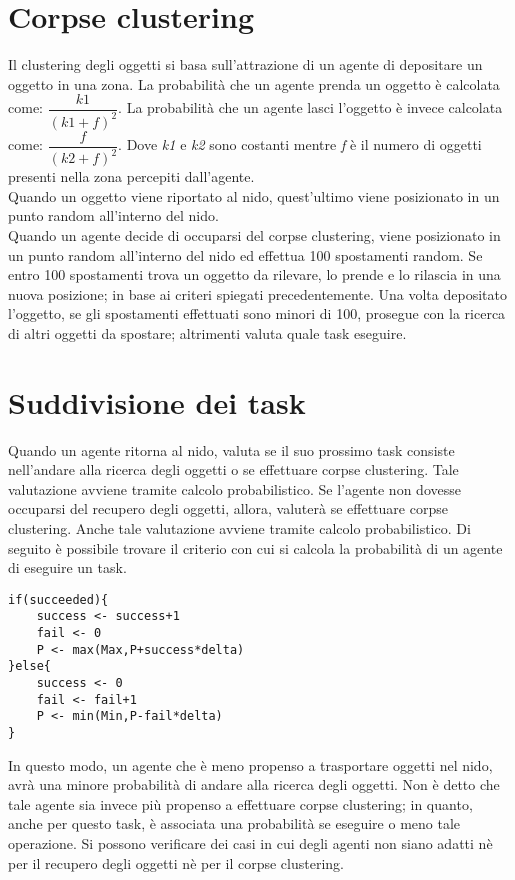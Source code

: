 \documentclass[12pt,a4paper,openright,twoside]{report}
\begin{document}
\section{Corpse clustering}

Il clustering degli oggetti si basa sull'attrazione di un agente di depositare un oggetto in una zona. La probabilità che un agente prenda un oggetto è calcolata come: $\dfrac{k1}{(k1+f)^2}$. La probabilità che un agente lasci l'oggetto è invece calcolata come: $\dfrac{f}{(k2+f)^2}$. Dove \textit{k1} e \textit{k2} sono costanti mentre \textit{f} è il numero di oggetti presenti nella zona percepiti dall'agente.\\
Quando un oggetto viene riportato al nido, quest'ultimo viene posizionato in un punto random all'interno del nido.\\
Quando un agente decide di occuparsi del corpse clustering, viene posizionato in un punto random all'interno del nido ed effettua 100 spostamenti random. Se entro 100 spostamenti trova un oggetto da rilevare, lo prende e lo rilascia in una nuova posizione; in base ai criteri spiegati precedentemente. Una volta depositato l'oggetto, se gli spostamenti effettuati sono minori di 100, prosegue con la ricerca di altri oggetti da spostare; altrimenti valuta quale task eseguire.

\section{Suddivisione dei task} 
Quando un agente ritorna al nido, valuta se il suo prossimo task consiste nell'andare alla ricerca degli oggetti o se effettuare corpse clustering. Tale valutazione avviene tramite calcolo probabilistico. Se l'agente non dovesse occuparsi del recupero degli oggetti, allora, valuterà se effettuare corpse clustering. Anche tale valutazione avviene tramite calcolo probabilistico. Di seguito è possibile trovare il criterio con cui si calcola la probabilità di un agente di eseguire un task.\\


\begin{verbatim}
if(succeeded){
    success <- success+1
    fail <- 0
    P <- max(Max,P+success*delta)
}else{
    success <- 0
    fail <- fail+1
    P <- min(Min,P-fail*delta)
}
\end{verbatim}

In questo modo, un agente che è meno propenso a trasportare oggetti nel nido, avrà una minore probabilità di andare alla ricerca degli oggetti. Non è detto che tale agente sia invece più propenso a effettuare corpse clustering; in quanto, anche per questo task, è associata una probabilità se eseguire o meno tale operazione. Si possono verificare dei casi in cui degli agenti non siano adatti nè per il recupero degli oggetti nè per il corpse clustering.
\end{document}

